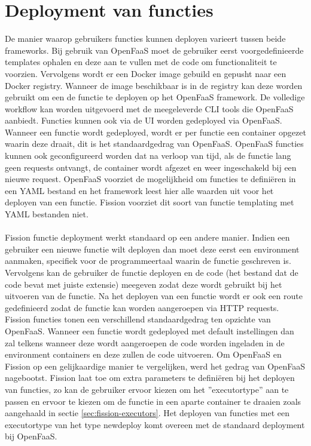 \section{Deployment van functies}
De manier waarop gebruikers functies kunnen deployen varieert tussen beide frameworks. Bij gebruik van OpenFaaS moet de gebruiker eerst voorgedefinieerde templates ophalen en deze aan te vullen met de code om functionaliteit te voorzien. Vervolgens wordt er een Docker image gebuild en gepusht naar een Docker registry. Wanneer de image beschikbaar is in de registry kan deze worden gebruikt om een de functie te deployen op het OpenFaaS framework. De volledige workflow kan worden uitgevoerd met de meegeleverde CLI tools die OpenFaaS aanbiedt. Functies kunnen ook via de UI worden gedeployed via OpenFaaS. Wanneer een functie wordt gedeployed, wordt er per functie een container opgezet waarin deze draait, dit is het standaardgedrag van OpenFaaS. OpenFaaS functies kunnen ook geconfigureerd worden dat na verloop van tijd, als de functie lang geen requests ontvangt, de container wordt afgezet en weer ingeschakeld bij een nieuwe request. OpenFaaS voorziet de mogelijkheid om functies te definiëren in een YAML bestand en het framework leest hier alle waarden uit voor het deployen van een functie. Fission voorziet dit soort van functie templating met YAML bestanden niet.
\\\\
Fission functie deployment werkt standaard op een andere manier. Indien een gebruiker een nieuwe functie wilt deployen dan moet deze eerst een environment aanmaken, specifiek voor de programmeertaal waarin de functie geschreven is. Vervolgens kan de gebruiker de functie deployen en de code (het bestand dat de code bevat met juiste extensie) meegeven zodat deze wordt gebruikt bij het uitvoeren van de functie. Na het deployen van een functie wordt er ook een route gedefinieerd zodat de functie kan worden aangeroepen via HTTP requests. Fission functies tonen een verschillend standaardgedrag ten opzichte van OpenFaaS. Wanneer een functie wordt gedeployed met default instellingen dan zal telkens wanneer deze wordt aangeroepen de code worden ingeladen in de environment containers en deze zullen de code uitvoeren. Om OpenFaaS en Fission op een gelijkaardige manier te vergelijken, werd het gedrag van OpenFaaS nagebootst. Fission laat toe om extra parameters te definiëren bij het deployen van functies, zo kan de gebruiker ervoor kiezen om het ''executortype'' aan te passen en ervoor te kiezen om de functie in een aparte container te draaien zoals aangehaald in sectie \ref{sec:fission-executors}. Het deployen van functies met een executortype van het type newdeploy komt overeen met de standaard deployment bij OpenFaaS.
